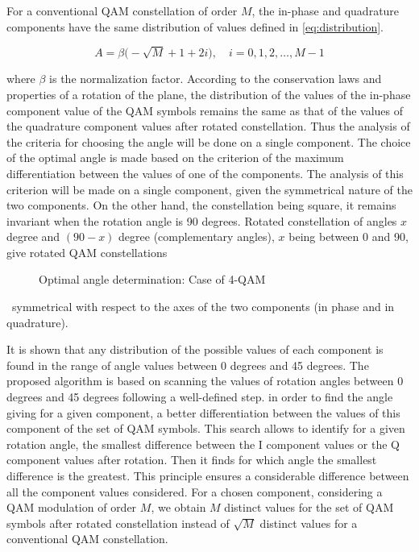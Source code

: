 For a conventional QAM constellation of order $M$, the in-phase and
quadrature components have the same distribution of values defined in
\eqref{eq:distribution}.

\begin{equation}
  A = \beta\bigl(-\sqrt{M} + 1 + 2i\bigr), \quad i = 0,1,2,\ldots,M-1
  \label{eq:distribution}
\end{equation}

where $\beta$ is the normalization factor. According to the conservation
laws and properties of a rotation of the plane, the distribution of the
values of the in-phase component value of the QAM symbols remains the same
as that of the values of the quadrature component values after rotated
constellation. Thus the analysis of the criteria for choosing the angle will
be done on a single component. The choice of the optimal angle is made based
on the criterion of the maximum differentiation between the values of one of
the components. The analysis of this criterion will be made on a single
component, given the symmetrical nature of the two components. On the other
hand, the constellation being square, it remains invariant when the rotation
angle is 90 degrees. Rotated constellation of angles $x$ degree and
$(90-x)$ degree (complementary angles), $x$ being between 0 and 90, give
rotated QAM constellations%
\begin{figure}[!t]
  \centering
  
  \caption{Optimal angle determination: Case of 4-QAM}
  \label{fig:optimal-angle-4qam}
\end{figure}
\ symmetrical with respect to the axes of the two components (in phase and
in quadrature).

It is shown that any distribution of the possible values of each component
is found in the range of angle values between 0 degrees and 45 degrees. The
proposed algorithm is based on scanning the values of rotation angles
between 0 degrees and 45 degrees following a well-defined step. in order to
find the angle giving for a given component, a better differentiation
between the values of this component of the set of QAM symbols. This search
allows to identify for a given rotation angle, the smallest difference
between the I component values or the Q component values after rotation.
Then it finds for which angle the smallest difference is the greatest. This
principle ensures a considerable difference between all the component values
considered. For a chosen component, considering a QAM modulation of order
$M$, we obtain $M$ distinct values for the set of QAM symbols after rotated
constellation instead of $\sqrt{M}$ distinct values for a conventional QAM
constellation.

